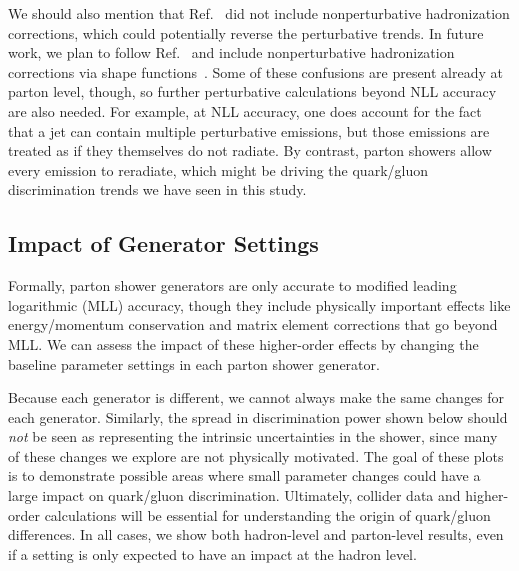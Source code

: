 \documentclass[11pt]{cernrep}
\begin{document}
We should also mention that Ref.~\cite{Larkoski:2013eya} did not include nonperturbative hadronization corrections, which could potentially reverse the perturbative trends.  In future work, we plan to follow Ref.~\cite{Larkoski:2013paa} and include nonperturbative hadronization corrections via shape functions~\cite{Manohar:1994kq, Dokshitzer:1995zt, Korchemsky:1999kt, Korchemsky:2000kp, Salam:2001bd, Lee:2006nr, Mateu:2012nk}.  Some of these confusions are present already at parton level, though, so further perturbative calculations beyond NLL accuracy are also needed.  For example, at NLL accuracy, one does account for the fact that a jet can contain multiple perturbative emissions, but those emissions are treated as if they themselves do not radiate.  By contrast, parton showers allow every emission to reradiate, which might be driving the quark/gluon discrimination trends we have seen in this study.




\subsection{Impact of Generator Settings}
\label{quarkgluon_sec:ee_settings}

Formally, parton shower generators are only accurate to modified leading logarithmic (MLL) accuracy, though they include physically important effects like energy/momentum conservation and matrix element corrections that go beyond MLL.  We can assess the impact of these higher-order effects by changing the baseline parameter settings in each parton shower generator.  

Because each generator is different, we cannot always make the same changes for each generator.  Similarly, the spread in discrimination power shown below should \emph{not} be seen as representing the intrinsic uncertainties in the shower, since many of these changes we explore are not physically motivated.  The goal of these plots is to demonstrate possible areas where small parameter changes could have a large impact on quark/gluon discrimination.  Ultimately, collider data and higher-order calculations will be essential for understanding the origin of quark/gluon differences.  In all cases, we show both hadron-level and parton-level results, even if a setting is only expected to have an impact at the hadron level.  
\end{document}
